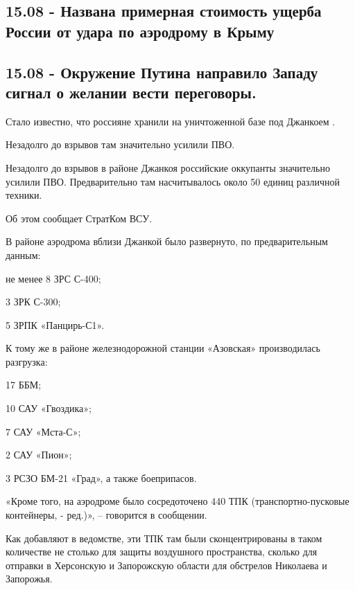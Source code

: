  
 
 
 
 

\subsection{15.08 - Названа примерная стоимость ущерба России от удара по аэродрому в Крыму}

\subsection{15.08 - Окружение Путина направило Западу сигнал о желании вести переговоры.}





Стало известно, что россияне хранили на уничтоженной базе под Джанкоем .

Незадолго до взрывов там значительно усилили ПВО.

Незадолго до взрывов в районе Джанкоя российские оккупанты значительно усилили ПВО. Предварительно там насчитывалось около 50 единиц различной техники.

Об этом сообщает СтратКом ВСУ.

В районе аэродрома вблизи Джанкой было развернуто, по предварительным данным:

не менее 8 ЗРС С-400;

3 ЗРК С-300;

5 ЗРПК «Панцирь-С1».

К тому же в районе железнодорожной станции «Азовская» производилась разгрузка:

17 ББМ;

10 САУ «Гвоздика»;

7 САУ «Мста-С»;

2 САУ «Пион»;

3 РСЗО БМ-21 «Град», а также боеприпасов.

«Кроме того, на аэродроме было сосредоточено 440 ТПК (транспортно-пусковые контейнеры, - ред.)», – говорится в сообщении.

Как добавляют в ведомстве, эти ТПК там были сконцентрированы в таком количестве не столько для защиты воздушного пространства, сколько для отправки в Херсонскую и Запорожскую области для обстрелов Николаева и Запорожья.

